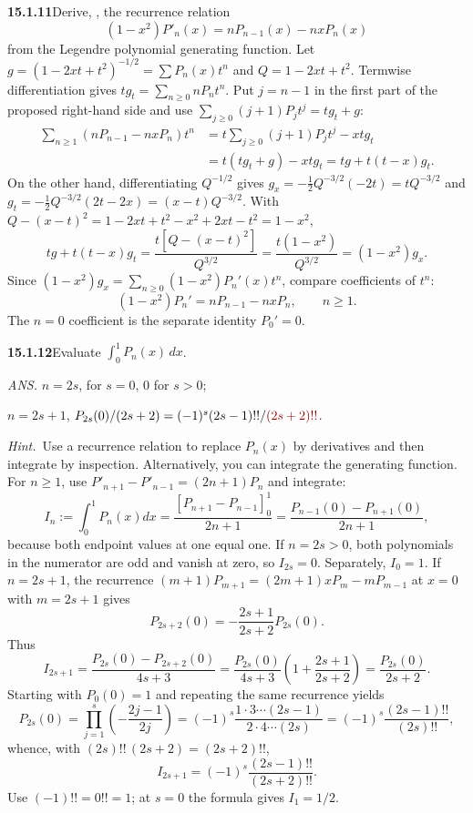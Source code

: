 \par\bigskip
\noindent\textbf{15.1.11}\quad Derive, , the recurrence relation
\[
(1-x^{2})P'_{n}(x)=nP_{n-1}(x)-nxP_{n}(x)
\]
from the Legendre polynomial generating function.
\solution
Let $g=(1-2xt+t^2)^{-1/2}=\sum P_n(x)t^n$ and $Q=1-2xt+t^2$.
Termwise differentiation gives $tg_t=\sum_{n\ge0}nP_nt^n$. Put $j=n-1$
in the first part of the proposed right-hand side and use
$\sum_{j\ge0}(j+1)P_jt^j=tg_t+g$:
\begin{align*}
\sum_{n\ge1}(nP_{n-1}-nxP_n)t^n
&=t\sum_{j\ge0}(j+1)P_jt^j-xtg_t\\
&=t(tg_t+g)-xtg_t=tg+t(t-x)g_t.
\end{align*}
On the other hand, differentiating $Q^{-1/2}$ gives
$g_x=-\frac12Q^{-3/2}(-2t)=tQ^{-3/2}$ and
$g_t=-\frac12Q^{-3/2}(2t-2x)=(x-t)Q^{-3/2}$. With
$Q-(x-t)^2=1-2xt+t^2-x^2+2xt-t^2=1-x^2$,
\[
tg+t(t-x)g_t
=\frac{t[Q-(x-t)^2]}{Q^{3/2}}
=\frac{t(1-x^2)}{Q^{3/2}}=(1-x^2)g_x.
\]
Since $(1-x^2)g_x=\sum_{n\ge0}(1-x^2)P_n'(x)t^n$, compare coefficients
of $t^n$:
\[
\boxed{(1-x^2)P_n'=nP_{n-1}-nxP_n},\qquad n\ge1.
\]
The $n=0$ coefficient is the separate identity $P_0'=0$.

\par\bigskip
\noindent\textbf{15.1.12}\quad Evaluate
$\displaystyle\int_{0}^{1}P_{n}(x)\,dx$.
\par\nobreak\hfill\emph{ANS.}\enspace
$n=2s$,  for $s=0$, 0 for $s>0$;\par\nobreak
\hfill$n=2s+1$, \quad
$P_{2s}(0)/(2s+2)=(-1)^{s}(2s-1)!!/\erratum{(2s+2)!!}$.
\par\emph{Hint.}~Use a recurrence relation to replace $P_{n}(x)$ by
derivatives and then integrate by inspection. Alternatively, you can
integrate the generating function.
\solution
For $n\ge1$, use $P'_{n+1}-P'_{n-1}=(2n+1)P_n$ and integrate:
\[
I_n:=\int_0^1P_n(x)dx
=\frac{[P_{n+1}-P_{n-1}]_0^1}{2n+1}
=\frac{P_{n-1}(0)-P_{n+1}(0)}{2n+1},
\]
because both endpoint values at one equal one.
If $n=2s>0$, both polynomials in the numerator are odd and vanish
at zero, so $I_{2s}=0$. Separately, $I_0=1$.
If $n=2s+1$, the recurrence $(m+1)P_{m+1}=(2m+1)xP_m-mP_{m-1}$ at
$x=0$ with $m=2s+1$ gives
\[
P_{2s+2}(0)=-\frac{2s+1}{2s+2}P_{2s}(0).
\]
Thus
\[
I_{2s+1}=\frac{P_{2s}(0)-P_{2s+2}(0)}{4s+3}
=\frac{P_{2s}(0)}{4s+3}\left(1+\frac{2s+1}{2s+2}\right)
=\frac{P_{2s}(0)}{2s+2}.
\]
Starting with $P_0(0)=1$ and repeating the same recurrence yields
\[
P_{2s}(0)=\prod_{j=1}^s\left(-\frac{2j-1}{2j}\right)
=(-1)^s\frac{1\cdot3\cdots(2s-1)}{2\cdot4\cdots(2s)}
=(-1)^s\frac{(2s-1)!!}{(2s)!!},
\]
whence, with $(2s)!!\,(2s+2)=(2s+2)!!$,
\[
\boxed{I_{2s+1}=(-1)^s\frac{(2s-1)!!}{(2s+2)!!}}.
\]
Use $(-1)!!=0!!=1$; at $s=0$ the formula gives $I_1=1/2$.

